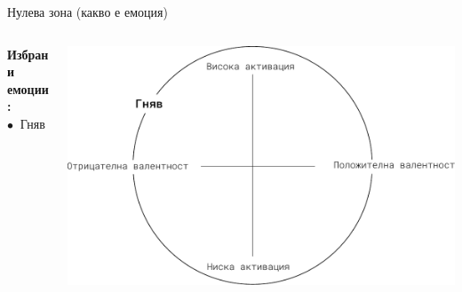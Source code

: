 \documentclass[9pt]{beamer}
\begin{document}
    \begin{frame}{Нулева зона (какво е емоция)}
        \begin{columns}[T] %
            \begin{column}{.38\textwidth}
                \textbf{Избрани емоции:}
                \vspace{1cm}\\
                $\bullet\ $ Гняв
                \vspace{1cm}\\
                \phantom{$\bullet\ $ Щастие}
                \vspace{1cm}\\
                \phantom{$\bullet\ $ Неутрална емоция}
                \vspace{1cm}\\
                \phantom{$\bullet\ $ Тъга}
            \end{column}%
            \hfill%
            \begin{column}{.60\textwidth}
                \vspace{1cm}
                \begin{center}
                    \includegraphics[width=\textwidth]{valence_arousal_a}%
                \end{center}
            \end{column}%
        \end{columns}
    \end{frame}
\end{document}
